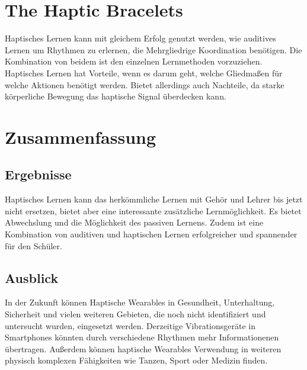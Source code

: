 \documentclass[ngerman,runningheads,a4paper]{llncs}
\begin{document}
\section{The Haptic Bracelets}
Haptisches Lernen kann mit gleichem Erfolg genutzt werden, wie auditives Lernen um Rhythmen zu erlernen, die Mehrgliedrige Koordination benötigen.
Die Kombination von beidem ist den einzelnen Lernmethoden vorzuziehen.
Haptisches Lernen hat Vorteile, wenn es darum geht, welche Gliedmaßen für welche Aktionen benötigt werden.
Bietet allerdings auch Nachteile, da starke körperliche Bewegung das haptische Signal überdecken kann. \cite{bouwer2013haptic}

\section{Zusammenfassung}
\subsection{Ergebnisse}
Haptisches Lernen kann das herkömmliche Lernen mit Gehör und Lehrer bis jetzt nicht ersetzen, bietet aber eine interessante zusätzliche Lernmöglichkeit.
Es bietet Abwechslung und die Möglichkeit des passiven Lernens.
Zudem ist eine Kombination von auditiven und haptischen Lernen erfolgreicher und spannender für den Schüler.

\subsection{Ausblick}
In der Zukunft können Haptische Wearables in Gesundheit, Unterhaltung, Sicherheit und vielen weiteren Gebieten, die noch nicht identifiziert und untersucht wurden, eingesetzt werden.
Derzeitige Vibrationsgeräte in Smartphones könnten durch verschiedene Rhythmen mehr Informationenen übertragen.
Außerdem können haptische Wearables Verwendung in weiteren physisch komplexen Fähigkeiten wie Tanzen, Sport oder Medizin finden. %




\end{document}
